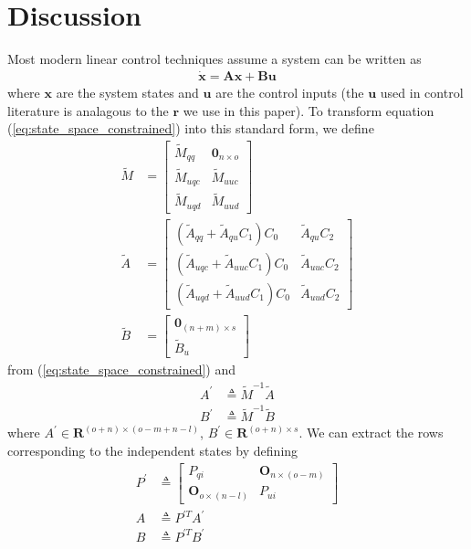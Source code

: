 \documentclass[smallcondensed,final]{svjour3}                     %
\begin{document}
\section{Discussion}
\label{sec:discussion}
Most modern linear control techniques assume a system can be written as
\begin{align}
\dot{\mathbf{x}} = \mathbf{A}\mathbf{x} + \mathbf{B}\mathbf{u}
\end{align}
where $\mathbf{x}$ are the system states and $\mathbf{u}$ are the control
inputs (the $\mathbf{u}$ used in control literature is analagous to the
$\mathbf{r}$ we use in this paper).  To transform equation
(\ref{eq:state_space_constrained}) into this standard form, we define
\begin{align}
\tilde{M} &=
\left[
\begin{array}{cc}
  \tilde{M}_{qq} & \bm{0}_{n \times o} \\
  \tilde{M}_{uqc} & \tilde{M}_{uuc} \\
  \tilde{M}_{uqd} & \tilde{M}_{uud}
\end{array}
\right]\\
\tilde{A} &=
   \left[
     \begin{array}{cc}
       (\tilde{A}_{qq} + \tilde{A}_{qu} C_1 ) C_0 & \tilde{A}_{qu} C_2 \\
       (\tilde{A}_{uqc} + \tilde{A}_{uuc} C_1 ) C_0 & \tilde{A}_{uuc} C_2\\
       (\tilde{A}_{uqd} + \tilde{A}_{uud} C_1 ) C_0 & \tilde{A}_{uud} C_2
     \end{array}
   \right]\\
\tilde{B} &= 
    \left[
      \begin{array}{c}
        \bm{0}_{(n+m) \times s} \\
        \tilde{B}_{u}
      \end{array}
    \right]
\end{align}
from (\ref{eq:state_space_constrained}) and
\begin{align}
  \label{eq:A_prime}
    A^\prime &\triangleq \tilde{M}^{-1} \tilde{A} \\
  \label{eq:B_prime}
    B^\prime &\triangleq \tilde{M}^{-1} \tilde{B}
\end{align}
where  $A^\prime \in \bm{R}^{(o + n) \times (o - m + n -l)}$, $B^\prime \in
\bm{R}^{(o + n) \times s}$.  We can extract the rows corresponding to the
independent states by defining
\begin{align}
  \label{eq:P_prime}
    P^\prime &\triangleq \begin{bmatrix}
        P_{qi} & \bm{O}_{n \times (o - m)} \\
        \bm{O}_{o \times (n - l)} & P_{ui}
    \end{bmatrix} \\
  \label{eq:A}
    A &\triangleq P^{\prime T} A^\prime \\
  \label{eq:B}
    B &\triangleq P^{\prime T} B^\prime
\end{align}
\end{document}
